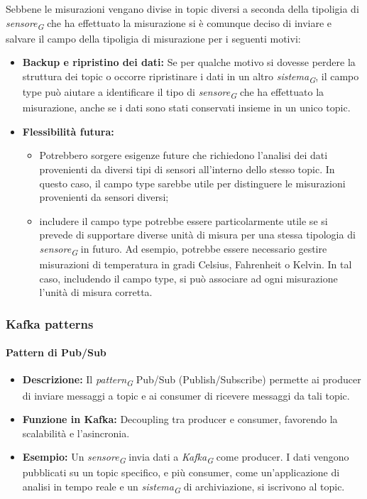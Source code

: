 Sebbene le misurazioni vengano divise in topic diversi a seconda della tipoligia di \textit{sensore}\textsubscript{\textit{G}} che ha effettuato la misurazione si è comunque deciso di inviare e salvare il campo della tipoligia di misurazione per i seguenti motivi:
\begin{itemize}
    \item \textbf{Backup e ripristino dei dati:} Se per qualche motivo si dovesse perdere la struttura dei topic o occorre ripristinare i dati in un altro \textit{sistema}\textsubscript{\textit{G}}, il campo type può aiutare a identificare il tipo di \textit{sensore}\textsubscript{\textit{G}} che ha effettuato la misurazione, anche se i dati sono stati conservati insieme in un unico topic.
    \item \textbf{Flessibilità futura:} 
    \begin{itemize}
        \item Potrebbero sorgere esigenze future che richiedono l'analisi dei dati provenienti da diversi tipi di sensori all'interno dello stesso topic. In questo caso, il campo type sarebbe utile per distinguere le misurazioni provenienti da sensori diversi;
        \item includere il campo type potrebbe essere particolarmente utile se si prevede di supportare diverse unità di misura per una stessa tipologia di \textit{sensore}\textsubscript{\textit{G}} in futuro. Ad esempio, potrebbe essere necessario gestire misurazioni di temperatura in gradi Celsius, Fahrenheit o Kelvin. In tal caso, includendo il campo type, si può associare ad ogni misurazione l'unità di misura corretta.
    \end{itemize}
\end{itemize}
    

\subsubsection{Kafka patterns}
\paragraph{Pattern di Pub/Sub}
\begin{itemize}
    \item \textbf{Descrizione:} Il \textit{pattern}\textsubscript{\textit{G}} Pub/Sub (Publish/Subscribe) permette ai producer di inviare messaggi a topic e ai consumer di ricevere messaggi da tali topic.
    \item \textbf{Funzione in Kafka:} Decoupling tra producer e consumer, favorendo la scalabilità e l'asincronia.
    \item \textbf{Esempio:} Un \textit{sensore}\textsubscript{\textit{G}} invia dati a \textit{Kafka}\textsubscript{\textit{G}} come producer. I dati vengono pubblicati su un topic specifico, e più consumer, come un'applicazione di analisi in tempo reale e un \textit{sistema}\textsubscript{\textit{G}} di archiviazione, si iscrivono al topic.
\end{itemize}

